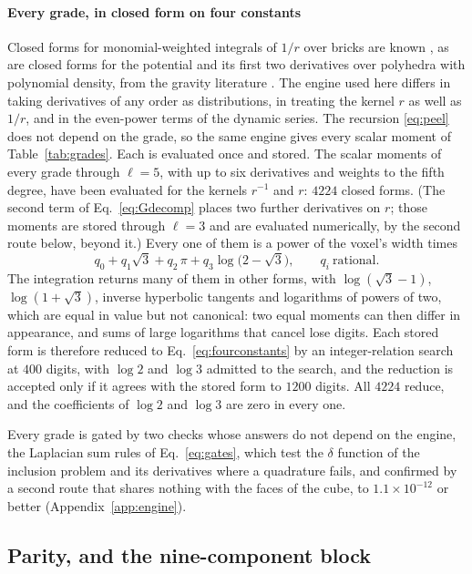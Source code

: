 \documentclass[preprint,review,12pt]{elsarticle}
\begin{document}
\paragraph{Every grade, in closed form on four constants} Closed forms for monomial-weighted
integrals of $1/r$ over bricks are known \citep{Hackbusch2002}, as are closed forms for the potential
and its first two derivatives over polyhedra with polynomial density, from the gravity literature
\citep{Ren2020}. The engine used here differs in taking derivatives of any order as distributions, in
treating the kernel $r$ as well as $1/r$, and in the even-power terms of the dynamic series. The
recursion \eqref{eq:peel} does not
depend on the grade, so the same engine gives every scalar moment of Table~\ref{tab:grades}. Each is
evaluated once and stored. The scalar moments of every grade through $\ell=5$, with up to six
derivatives and weights to the fifth degree, have been evaluated for the kernels $r^{-1}$ and $r$:
$4224$ closed forms. (The second term of Eq.~\eqref{eq:Gdecomp} places two further derivatives on
$r$; those moments are stored through $\ell=3$ and are evaluated numerically, by the second route
below, beyond it.) Every one of them is a power of the voxel's width times
\begin{equation}\label{eq:fourconstants}
  q_0+q_1\sqrt3+q_2\,\pi+q_3\log\bigl(2-\sqrt3\bigr),\qquad q_i\ \text{rational}.
\end{equation}
The integration returns many of them in other forms, with $\log(\sqrt3-1)$, $\log(1+\sqrt3)$, inverse
hyperbolic tangents and logarithms of powers of two, which are equal in value but not canonical: two
equal moments can then differ in appearance, and sums of large logarithms that cancel lose digits. Each
stored form is therefore reduced to Eq.~\eqref{eq:fourconstants} by an integer-relation search at $400$
digits, with $\log2$ and $\log3$ admitted to the search, and the reduction is accepted only if it agrees
with the stored form to $1200$ digits. All $4224$ reduce, and the coefficients of $\log2$ and $\log3$
are zero in every one.

Every grade is gated by two checks whose answers do not depend on the engine, the Laplacian
sum rules of Eq.~\eqref{eq:gates}, which test the $\delta$ function of the inclusion problem and its
derivatives where a quadrature fails, and confirmed by a second route that shares nothing with the
faces of the cube, to $1.1\times10^{-12}$ or better (Appendix~\ref{app:engine}).

\subsection{Parity, and the nine-component block}\label{sec:parity}
\end{document}
